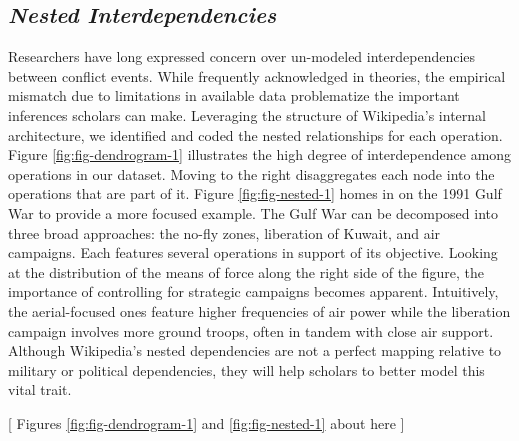 \documentclass[fleqn,12pt]{article}
\begin{document}
\subsection*{\textit{Nested Interdependencies}}
Researchers have long expressed concern over un-modeled interdependencies between conflict events. While frequently acknowledged in theories, the empirical mismatch due to limitations in available data problematize the important inferences scholars can make. Leveraging the structure of Wikipedia’s internal architecture, we identified and coded the nested relationships for each operation. Figure \ref{fig:fig-dendrogram-1} illustrates the high degree of interdependence among operations in our dataset. Moving to the right disaggregates each node into the operations that are part of it. Figure \ref{fig:fig-nested-1} homes in on the 1991 Gulf War to provide a more focused example. The Gulf War can be decomposed into three broad approaches: the no-fly zones, liberation of Kuwait, and air campaigns. Each features several operations in support of its objective. Looking at the distribution of the means of force along the right side of the figure, the importance of controlling for strategic campaigns becomes apparent. Intuitively, the aerial-focused ones feature higher frequencies of air power while the liberation campaign involves more ground troops, often in tandem with close air support. Although Wikipedia’s nested dependencies are not a perfect mapping relative to military or political dependencies, they will help scholars to better model this vital trait. 

\begin{center}
	[ Figures \ref{fig:fig-dendrogram-1} and \ref{fig:fig-nested-1} about here ]
\end{center}
\end{document}

